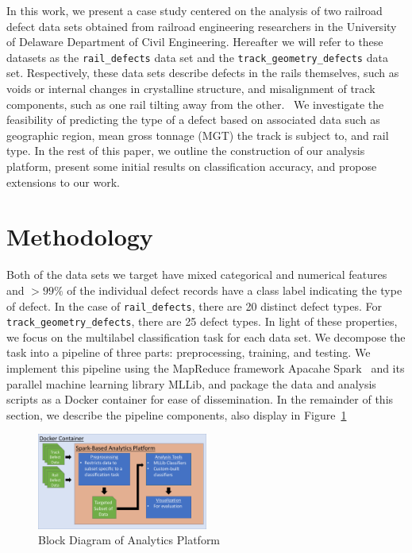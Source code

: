 \documentclass{sig-alternate-05-2015}
\begin{document}
In this work, we present a case study centered on the analysis of two railroad defect data sets
obtained from railroad engineering researchers in the University of Delaware Department of 
Civil Engineering. Hereafter we will refer to these datasets as the \texttt{rail\_defects} data 
set and the \texttt{track\_geometry\_defects} data set. Respectively, these data sets describe 
defects in the rails themselves, such as voids or internal changes in crystalline structure, 
and misalignment of track components, such as one rail tilting away from the other.~\cite{Zarembski:14}
We investigate the feasibility of predicting the type of a defect based on associated data such 
as geographic region, mean gross tonnage (MGT) the track is subject to, and rail type. 
In the rest of this paper, we outline the construction of our analysis platform, present some
initial results on classification accuracy, and propose extensions to our work. 

\section{Methodology}
Both of the data sets we target have mixed categorical and numerical features and $>99\%$ of
the individual defect records have a class label indicating the type of defect. In the case of 
\texttt{rail\_defects}, there are 20 distinct defect types. For  
\texttt{track\_geometry\_defects}, there are 25 defect types. In light of these properties, we
focus on the multilabel classification task for each data set. We decompose the task into a 
pipeline of three parts: preprocessing, training, and testing. We implement this pipeline using
the MapReduce framework Apacahe Spark~\cite{Zaharia:2012} and its parallel machine learning library
MLLib, and package the data and analysis scripts as a Docker container for ease of dissemination. 
In the remainder of this section, we describe the pipeline components, also display in 
Figure~\ref{fig_block_diagram}
\begin{figure}[ht!]
\includegraphics[width=0.50\textwidth]{block_diagram.pdf}
\caption{Block Diagram of Analytics Platform}
\label{fig_block_diagram}
\end{figure}
\end{document}
